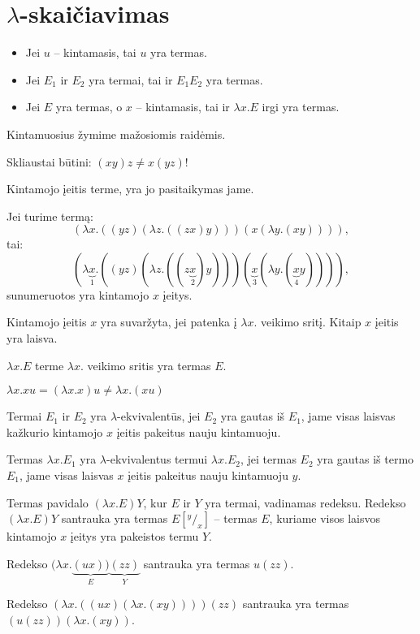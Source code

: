 \chapter{$\lambda$-skaičiavimas}

\begin{defn}
  \begin{itemize}
    \item Jei $u$ – kintamasis, tai $u$ yra termas.
    \item Jei $E_{1}$ ir $E_{2}$ yra termai, tai ir $E_{1}E_{2}$ yra 
      termas.
    \item Jei $E$ yra termas, o $x$ – kintamasis, tai ir 
      $\lambda x.E$ irgi yra termas.
  \end{itemize}
  \begin{note}
    Kintamuosius žymime mažosiomis raidėmis.
  \end{note}
  \begin{note}
    Skliaustai būtini: $(xy)z \not = x(yz)$!
  \end{note}
\end{defn}

Kintamojo įeitis terme, yra jo pasitaikymas jame.
\begin{exmp}
  Jei turime termą:
  \[
  (\lambda x.((yz)(\lambda z.((zx)y)))(x(\lambda y.(xy)))),
  \]
  tai:
  \[
  (\lambda \underbrace{x}_{1}.((yz)
  (\lambda z.((z\underbrace{x}_{2})y)))
  (\underbrace{x}_{3}(\lambda y.(\underbrace{x}_{4}y)))),
  \]
  sunumeruotos yra kintamojo $x$ įeitys.
\end{exmp}

Kintamojo įeitis $x$ yra suvaržyta, jei patenka į $\lambda x.$ veikimo
sritį. Kitaip $x$ įeitis yra laisva.
\begin{note}
  $\lambda x.E$ terme $\lambda x.$ veikimo sritis yra termas $E$.
\end{note}
\begin{note}
  $\lambda x.xu = (\lambda x.x)u \not = \lambda x.(xu)$ 
\end{note}

Termai $E_{1}$ ir $E_{2}$ yra $\lambda$-ekvivalentūs, jei $E_{2}$ yra
gautas iš $E_{1}$, jame visas laisvas kažkurio kintamojo $x$ įeitis
pakeitus nauju kintamuoju.

Termas $\lambda x.E_{1}$ yra $\lambda$-ekvivalentus termui 
$\lambda x.E_{2}$, jei termas $E_{2}$ yra gautas iš termo $E_{1}$, jame
visas  laisvas $x$ įeitis pakeitus nauju kintamuoju $y$.

\begin{defn}
  Termas pavidalo $(\lambda x.E)Y$, kur $E$ ir $Y$ yra termai, vadinamas
  redeksu. Redekso $(\lambda x.E)Y$ santrauka yra termas $E[^y/_x]$
  – termas $E$, kuriame visos laisvos kintamojo $x$ įeitys yra pakeistos
  termu $Y$.
  \begin{exmp}
    Redekso $(\lambda x.\underbrace{(ux))}_{E}\underbrace{(zz)}_{Y}$
    santrauka yra termas $u(zz)$.
  \end{exmp}
  \begin{exmp}
    Redekso $(\lambda x.((ux)(\lambda x.(xy))))(zz)$ santrauka yra 
    termas $(u(zz))(\lambda x.(xy))$.
  \end{exmp}
\end{defn}

